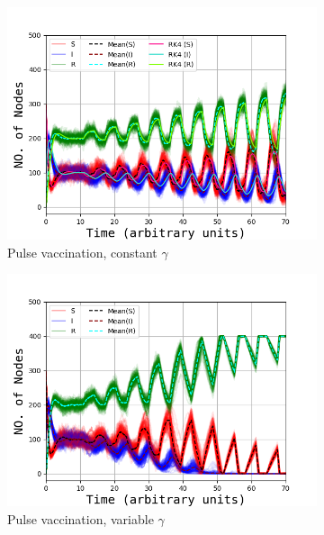  \begin{figure}[H]
		\centering
		\begin{subfigure}{0.49\linewidth}
			\includegraphics[width=1.1\linewidth]{Figures/Vax_Pulse2t_ckonst_4_1_05.png}
			\caption{Pulse vaccination, constant $\gamma$}
		\end{subfigure}
		\begin{subfigure}{0.49\linewidth}
			\includegraphics[width=1.1\linewidth]{Figures/Vax_Pulse2t_cvar_4_1_05.png}
			\caption{Pulse vaccination, variable $\gamma$}
		\end{subfigure}
		\begin{subfigure}{0.49\linewidth}

\end{subfigure}
\end{figure}

